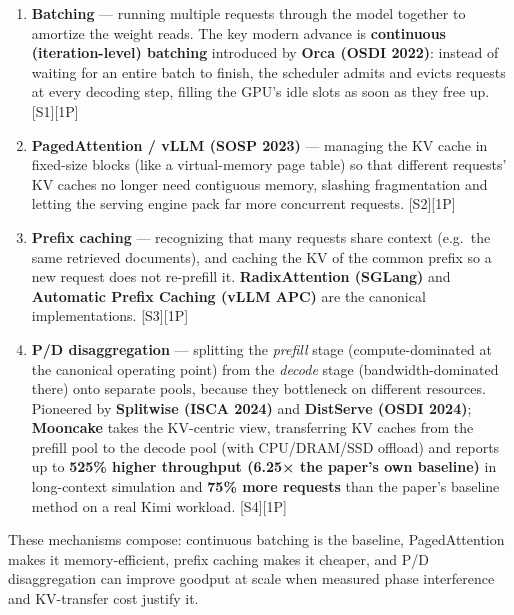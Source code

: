 \begin{enumerate}
\def\labelenumi{\arabic{enumi}.}
\item
  \textbf{Batching} --- running multiple requests through the model
  together to amortize the weight reads. The key modern advance is
  \textbf{continuous (iteration-level) batching} introduced by
  \textbf{Orca (OSDI 2022)}: instead of waiting for an entire batch to
  finish, the scheduler admits and evicts requests at every decoding
  step, filling the GPU's idle slots as soon as they free up.
  \mbox{{[}S1{]}}\hspace{0pt}\mbox{{[}1P{]}}
\item
  \textbf{PagedAttention / vLLM (SOSP 2023)} --- managing the KV cache
  in fixed-size blocks (like a virtual-memory page table) so that
  different requests' KV caches no longer need contiguous memory,
  slashing fragmentation and letting the serving engine pack far more
  concurrent requests. \mbox{{[}S2{]}}\hspace{0pt}\mbox{{[}1P{]}}
\item
  \textbf{Prefix caching} --- recognizing that many requests share
  context (e.g.~the same retrieved documents), and caching the KV of the
  common prefix so a new request does not re-prefill it.
  \textbf{RadixAttention (SGLang)} and \textbf{Automatic Prefix Caching
  (vLLM APC)} are the canonical implementations. \mbox{{[}S3{]}}\hspace{0pt}\mbox{{[}1P{]}}
\item
  \textbf{P/D disaggregation} --- splitting the \emph{prefill} stage
  (compute-dominated at the canonical operating point) from the
  \emph{decode} stage (bandwidth-dominated there) onto separate pools,
  because they bottleneck on different resources. Pioneered by
  \textbf{Splitwise (ISCA 2024)} and \textbf{DistServe (OSDI 2024)};
  \textbf{Mooncake} takes the KV-centric view, transferring KV caches
  from the prefill pool to the decode pool (with CPU/DRAM/SSD offload)
  and reports up to \textbf{525\% higher throughput (6.25× the paper's
  own baseline)} in long-context simulation and \textbf{75\% more
  requests} than the paper's baseline method on a real Kimi workload.
  \mbox{{[}S4{]}}\hspace{0pt}\mbox{{[}1P{]}}
\end{enumerate}

These mechanisms compose: continuous batching is the baseline,
PagedAttention makes it memory-efficient, prefix caching makes it
cheaper, and P/D disaggregation can improve goodput at scale when
measured phase interference and KV-transfer cost justify it.

